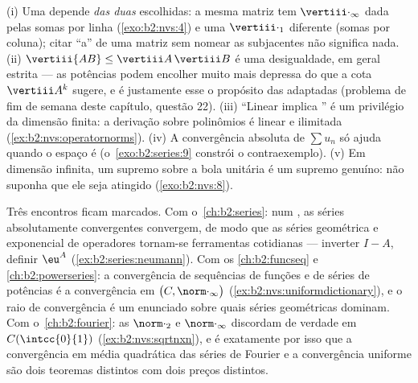 \begin{remark}\label{rem:b2:nvs:pitfalls}
(i) Uma  depende \emph{das duas}  escolhidas: a
mesma matriz tem $\vertiii\cdot_\infty$ dada pelas somas por linha
(\cref{exo:b2:nvs:4}) e uma $\vertiii\cdot_1$ diferente (somas por
coluna); citar ``a''  de uma matriz sem nomear as
 subjacentes não significa nada. (ii) $\vertiii{AB} \leq
\vertiii A\,\vertiii B$ é uma desigualdade, em geral estrita ---
as potências podem encolher muito mais depressa do que a cota $\vertiii A^k$
sugere, e é justamente esse o propósito das  adaptadas (problema
de fim de semana deste capítulo, questão 22). (iii) ``Linear implica
'' é um privilégio da dimensão finita: a derivação
sobre polinômios é linear e ilimitada
(\cref{ex:b2:nvs:operatornorms}). (iv) A convergência absoluta de
$\sum u_n$ só ajuda quando o espaço é 
(o~\cref{exo:b2:series:9} constrói o contraexemplo). (v) Em
dimensão infinita, um supremo sobre a bola unitária é um supremo
genuíno: não suponha que ele seja atingido
(\cref{exo:b2:nvs:8}).
\end{remark}

\begin{remark}\label{rem:b2:nvs:perspectives}
Três encontros ficam marcados. Com o~\cref{ch:b2:series}: num
, as séries absolutamente convergentes convergem, de modo que as
séries geométrica e exponencial de operadores tornam-se ferramentas
cotidianas --- inverter $I - A$, definir $\eu^{A}$
(\cref{ex:b2:series:neumann}). Com os
\cref{ch:b2:funcseq} e \cref{ch:b2:powerseries}: a convergência
de sequências de funções e de séries de potências é a convergência em
$\bigl(C, \norm\cdot_\infty\bigr)$
(\cref{ex:b2:nvs:uniformdictionary}), e o raio de
convergência é um enunciado sobre quais séries geométricas
dominam. Com o~\cref{ch:b2:fourier}: as 
$\norm\cdot_2$ e $\norm\cdot_\infty$ discordam de verdade em
$C(\intcc{0}{1})$ (\cref{ex:b2:nvs:sqrtnxn}), e é exatamente
por isso que a convergência em média quadrática das séries de Fourier e a convergência
uniforme são dois teoremas distintos com dois preços distintos.
\end{remark}

